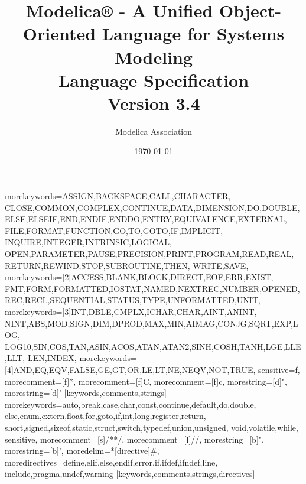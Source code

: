 %
  {morekeywords={ASSIGN,BACKSPACE,CALL,CHARACTER,%
      CLOSE,COMMON,COMPLEX,CONTINUE,DATA,DIMENSION,DO,DOUBLE,%
      ELSE,ELSEIF,END,ENDIF,ENDDO,ENTRY,EQUIVALENCE,EXTERNAL,%
      FILE,FORMAT,FUNCTION,GO,TO,GOTO,IF,IMPLICIT,%
      INQUIRE,INTEGER,INTRINSIC,LOGICAL,%
      OPEN,PARAMETER,PAUSE,PRECISION,PRINT,PROGRAM,READ,REAL,%
      RETURN,REWIND,STOP,SUBROUTINE,THEN,%
      WRITE,SAVE},%
    morekeywords=[2]{ACCESS,BLANK,BLOCK,DIRECT,EOF,ERR,EXIST,%
      FMT,FORM,FORMATTED,IOSTAT,NAMED,NEXTREC,NUMBER,OPENED,%
      REC,RECL,SEQUENTIAL,STATUS,TYPE,UNFORMATTED,UNIT},%
    morekeywords=[3]{INT,DBLE,CMPLX,ICHAR,CHAR,AINT,ANINT,%
      NINT,ABS,MOD,SIGN,DIM,DPROD,MAX,MIN,AIMAG,CONJG,SQRT,EXP,LOG,%
      LOG10,SIN,COS,TAN,ASIN,ACOS,ATAN,ATAN2,SINH,COSH,TANH,LGE,LLE,LLT,%
      LEN,INDEX},%
    morekeywords=[4]{AND,EQ,EQV,FALSE,GE,GT,OR,LE,LT,NE,NEQV,NOT,TRUE},%
   sensitive=f,%
   morecomment=[f]*,%
   morecomment=[f]C,%
   morecomment=[f]c,%
   morestring=[d]",%
   morestring=[d]'%
  }[keywords,comments,strings]%
%
  {morekeywords={auto,break,case,char,const,continue,default,do,double,%
      else,enum,extern,float,for,goto,if,int,long,register,return,%
      short,signed,sizeof,static,struct,switch,typedef,union,unsigned,%
      void,volatile,while},%
   sensitive,%
   morecomment=[s]{/*}{*/},%
   morecomment=[l]//,%
   morestring=[b]",%
   morestring=[b]',%
   moredelim=*[directive]\#,%
   moredirectives={define,elif,else,endif,error,if,ifdef,ifndef,line,%
      include,pragma,undef,warning}%
  }[keywords,comments,strings,directives]%


\title{Modelica® - A Unified Object-Oriented Language for Systems
Modeling\\[2\baselineskip]Language
Specification\\[2\baselineskip]Version 3.4}
\date{\today}
\author{Modelica Association}
